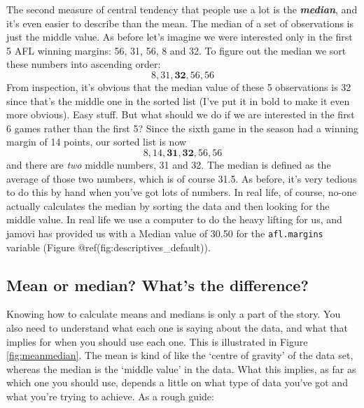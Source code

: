 \documentclass[
]{book}
\begin{document}
The second measure of central tendency that people use a lot is the \textbf{\emph{median}}, and it's even easier to describe than the mean. The median of a set of observations is just the middle value. As before let's imagine we were interested only in the first 5 AFL winning margins: 56, 31, 56, 8 and 32. To figure out the median we sort these numbers into ascending order:
\[
8, 31, \mathbf{32}, 56, 56
\]
From inspection, it's obvious that the median value of these 5 observations is 32 since that's the middle one in the sorted list (I've put it in bold to make it even more obvious). Easy stuff. But what should we do if we are interested in the first 6 games rather than the first 5? Since the sixth game in the season had a winning margin of 14 points, our sorted list is now
\[
8, 14, \mathbf{31}, \mathbf{32}, 56, 56
\]
and there are \emph{two} middle numbers, 31 and 32. The median is defined as the average of those two numbers, which is of course 31.5. As before, it's very tedious to do this by hand when you've got lots of numbers. In real life, of course, no-one actually calculates the median by sorting the data and then looking for the middle value. In real life we use a computer to do the heavy lifting for us, and jamovi has provided us with a Median value of 30.50 for the \texttt{afl.margins} variable (Figure @ref(fig:descriptives\_default)).

\hypertarget{mean-or-median-whats-the-difference}{%
\subsection{Mean or median? What's the difference?}\label{mean-or-median-whats-the-difference}}

Knowing how to calculate means and medians is only a part of the story. You also need to understand what each one is saying about the data, and what that implies for when you should use each one. This is illustrated in Figure \ref{fig:meanmedian}. The mean is kind of like the `centre of gravity' of the data set, whereas the median is the `middle value' in the data. What this implies, as far as which one you should use, depends a little on what type of data you've got and what you're trying to achieve. As a rough guide:
\end{document}
